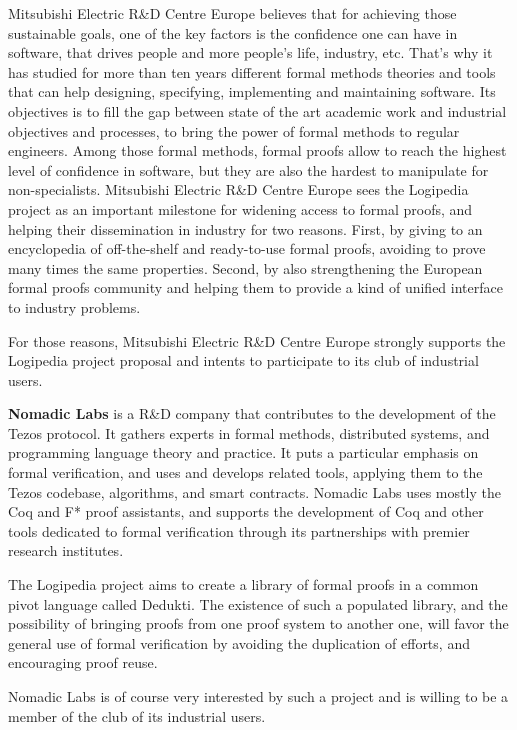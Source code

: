 Mitsubishi Electric R\&D Centre Europe believes that for achieving
those sustainable goals, one of the key factors is the confidence one
can have in software, that drives people and more people's life,
industry, etc. That's why it has studied for more than ten years
different formal methods theories and tools that can help designing,
specifying, implementing and maintaining software. Its objectives is
to fill the gap between state of the art academic work and industrial
objectives and processes, to bring the power of formal methods to
regular engineers. Among those formal methods, formal proofs allow to
reach the highest level of confidence in software, but they are also
the hardest to manipulate for non-specialists. Mitsubishi Electric
R\&D Centre Europe sees the Logipedia project as an important
milestone for widening access to formal proofs, and helping their
dissemination in industry for two reasons. First, by giving to an
encyclopedia of off-the-shelf and ready-to-use formal proofs, avoiding
to prove many times the same properties. Second, by also strengthening
the European formal proofs community and helping them to provide a
kind of unified interface to industry problems.

For those reasons, Mitsubishi Electric R\&D Centre Europe strongly
supports the Logipedia project proposal and intents to participate to
its club of industrial users.

{\bf Nomadic Labs} is a R\&D company that contributes to the
development of the Tezos protocol. It gathers experts in formal
methods, distributed systems, and programming language theory and
practice. It puts a particular emphasis on formal verification, and
uses and develops related tools, applying them to the Tezos codebase,
algorithms, and smart contracts. Nomadic Labs uses mostly the Coq and
F* proof assistants, and supports the development of Coq and other
tools dedicated to formal verification through its partnerships with
premier research institutes.

The Logipedia project aims to create a library of formal proofs in a
common pivot language called Dedukti. The existence of such a
populated library, and the possibility of bringing proofs from one
proof system to another one, will favor the general use of formal
verification by avoiding the duplication of efforts, and encouraging
proof reuse.

Nomadic Labs is of course very interested by such a project and is
willing to be a member of the club of its industrial users.

